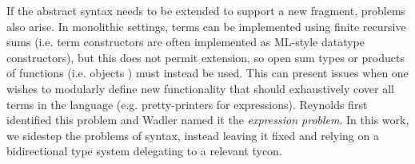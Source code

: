 \documentclass[9pt,preprint]{sigplanconf}
\begin{document}
If the abstract syntax needs to be extended to support a new fragment, problems also arise. In monolithic settings, terms can be implemented using finite recursive sums (i.e. term constructors are often implemented as ML-style datatype constructors), but this does not permit extension, so open sum types or products of functions (i.e. objects \cite{conf/oopsla/Aldrich13}) must instead be used. This can present issues when one wishes to modularly define new functionality that should exhaustively cover all terms in the language (e.g. pretty-printers for expressions). Reynolds first identified this problem \cite{Reynolds75} and Wadler named it the \emph{expression problem}. 
In this work, we sidestep the problems of syntax, instead leaving it fixed and relying on a bidirectional type system delegating to a relevant tycon. %
\end{document}
